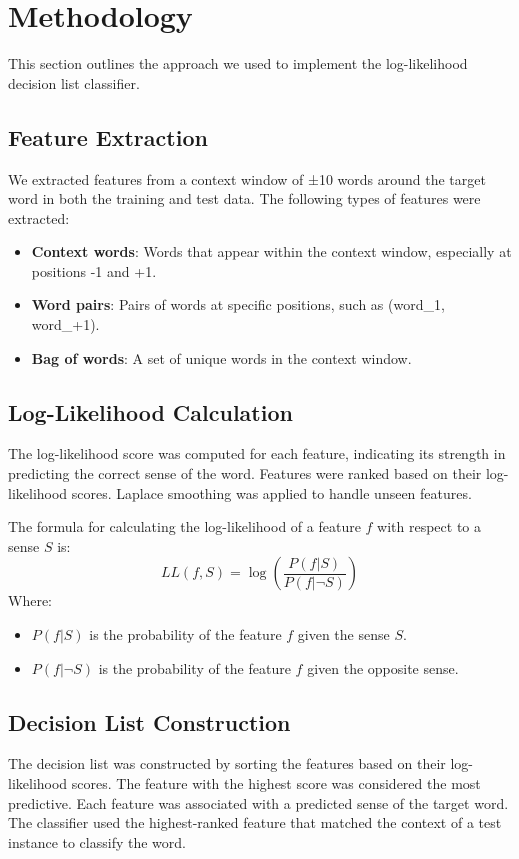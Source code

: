 \documentclass[journal,onecolumn]{IEEEtran}
\begin{document}
\section{Methodology}
This section outlines the approach we used to implement the log-likelihood decision list classifier.

\subsection{Feature Extraction}
We extracted features from a context window of ±10 words around the target word in both the training and test data. The following types of features were extracted:
\begin{itemize}
    \item \textbf{Context words}: Words that appear within the context window, especially at positions -1 and +1.
    \item \textbf{Word pairs}: Pairs of words at specific positions, such as (word\_1, word\_+1).
    \item \textbf{Bag of words}: A set of unique words in the context window.
\end{itemize}

\subsection{Log-Likelihood Calculation}
The log-likelihood score was computed for each feature, indicating its strength in predicting the correct sense of the word. Features were ranked based on their log-likelihood scores. Laplace smoothing was applied to handle unseen features.

The formula for calculating the log-likelihood of a feature $f$ with respect to a sense $S$ is:
\[
LL(f, S) = \log\left(\frac{P(f | S)}{P(f | \neg S)}\right)
\]
Where:
\begin{itemize}
    \item $P(f | S)$ is the probability of the feature $f$ given the sense $S$.
    \item $P(f | \neg S)$ is the probability of the feature $f$ given the opposite sense.
\end{itemize}

\subsection{Decision List Construction}
The decision list was constructed by sorting the features based on their log-likelihood scores. The feature with the highest score was considered the most predictive. Each feature was associated with a predicted sense of the target word. The classifier used the highest-ranked feature that matched the context of a test instance to classify the word.
\end{document}
